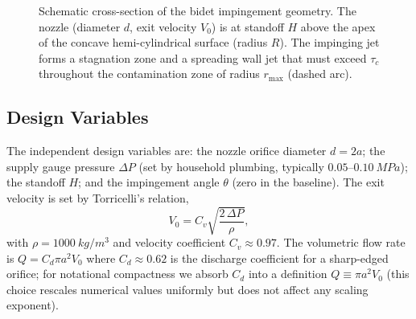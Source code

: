 \documentclass[aps,prfluids,reprint,amsmath,amssymb,floatfix]{revtex4-2}
\begin{document}
\begin{figure}[h]
\centering
{}
\caption{Schematic cross-section of the bidet impingement geometry.
The nozzle (diameter $d$, exit velocity $V_0$) is at standoff $H$ above
the apex of the concave hemi-cylindrical surface (radius $R$). The
impinging jet forms a stagnation zone and a spreading wall jet that
must exceed $\tau_c$ throughout the contamination zone of radius
$r_\mathrm{max}$ (dashed arc).}
\label{fig:geometry}
\end{figure}

\subsection{Design Variables}

The independent design variables are: the nozzle orifice diameter
$d = 2a$; the supply gauge pressure $\Delta P$ (set by household plumbing,
typically $0.05$--$\SI{0.10}{MPa}$); the standoff $H$; and the impingement
angle $\theta$ (zero in the baseline). The exit velocity is set by
Torricelli's relation,
\begin{equation}
  V_0 = C_v \sqrt{\frac{2\,\Delta P}{\rho}},
  \label{eq:torricelli}
\end{equation}
with $\rho = \SI{1000}{kg/m^3}$ and velocity coefficient $C_v \approx 0.97$.
The volumetric flow rate is $Q = C_d \pi a^2 V_0$ where $C_d \approx 0.62$
is the discharge coefficient for a sharp-edged orifice; for notational
compactness we absorb $C_d$ into a definition $Q \equiv \pi a^2 V_0$ (this
choice rescales numerical values uniformly but does not affect any scaling
exponent).
\end{document}
